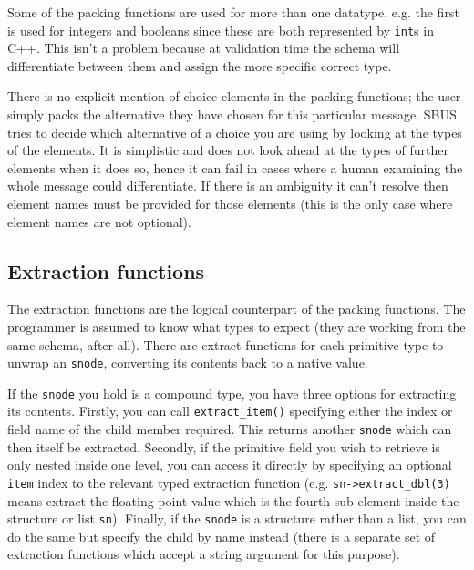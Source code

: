 \documentclass[12pt,a4paper,twoside]{article}
\renewcommand{\_}{\texttt{\symbol{95}}}
\begin{document}
Some of the packing functions are used for more than one datatype,
e.g. the first is used for integers and booleans
since these are both represented by \verb^int^s in C++. This isn't
a problem because at validation time the schema will differentiate
between them and assign the more specific correct type.

There is no explicit mention of choice elements in the
packing functions; the user simply packs the alternative they have chosen for
this particular message. SBUS tries to decide which alternative of a choice
you are using by looking at the types of the elements. It is
simplistic and does not look ahead at the types of further elements when it
does so, hence it can fail in cases where a human examining the whole message
could differentiate. If there is an ambiguity it can't resolve then
element names must be provided for those elements (this is the only
case where element names are not optional).

\subsection{Extraction functions}

The extraction functions are the logical counterpart of the packing
functions. The programmer is assumed to know what types to expect
(they are working from the same schema, after all). There are
extract functions for each primitive type to unwrap an \verb^snode^,
converting its contents back to a native value.

If the \verb^snode^ you hold is a compound type, you have three options for
extracting its contents. Firstly, you can call \verb^extract_item()^ specifying
either the index or field name of the child member required. This returns
another \verb^snode^ which can then itself be extracted. Secondly, if the
primitive field you wish to retrieve is only nested inside one level, you can
access it directly by specifying an optional \verb^item^ index to the relevant
typed extraction function (e.g. \verb^sn->extract_dbl(3)^ means extract the
floating point value which is the fourth sub-element inside the structure or
list \verb^sn^). Finally, if the \verb^snode^ is a structure rather than
a list, you can do the same but specify the child by name
instead (there is a separate set of extraction functions which accept a string
argument for this purpose).
\end{document}
